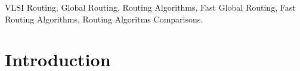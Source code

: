 \documentclass[conference]{IEEEtran}
\begin{document}

\begin{IEEEkeywords}
VLSI Routing, Global Routing, Routing Algorithms, Fast Global Routing, Fast Routing Algorithms, Routing Algoritms Comparisons.
\end{IEEEkeywords}


\section{Introduction}
\end{document}

